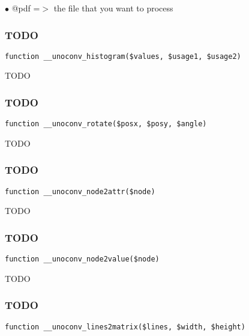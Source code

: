 \documentclass[a4paper]{article}
\begin{document}
\begin{compactitem}
\item[\color{myblue}$\bullet$] @pdf =$>$ the file that you want to process
\end{compactitem}

\hypertarget{toc540}{}
\subsubsection{TODO}

\begin{lstlisting}
function __unoconv_histogram($values, $usage1, $usage2)
\end{lstlisting}

TODO

\hypertarget{toc541}{}
\subsubsection{TODO}

\begin{lstlisting}
function __unoconv_rotate($posx, $posy, $angle)
\end{lstlisting}

TODO

\hypertarget{toc542}{}
\subsubsection{TODO}

\begin{lstlisting}
function __unoconv_node2attr($node)
\end{lstlisting}

TODO

\hypertarget{toc543}{}
\subsubsection{TODO}

\begin{lstlisting}
function __unoconv_node2value($node)
\end{lstlisting}

TODO

\hypertarget{toc544}{}
\subsubsection{TODO}

\begin{lstlisting}
function __unoconv_lines2matrix($lines, $width, $height)
\end{lstlisting}
\end{document}
